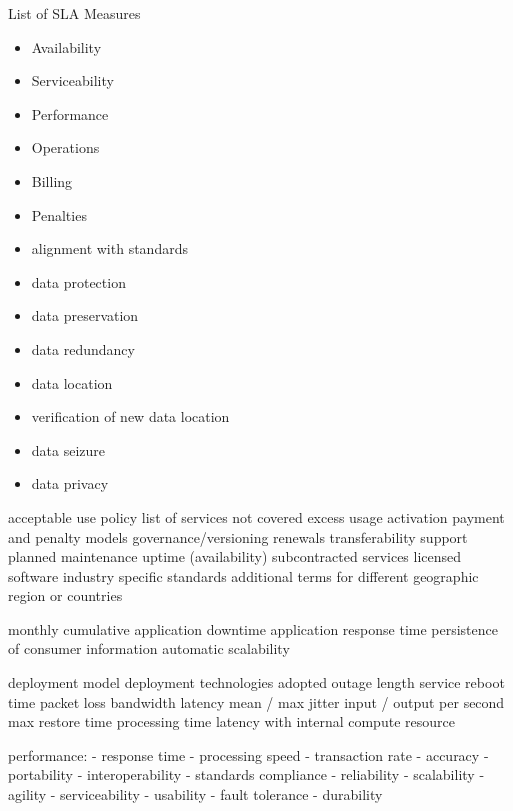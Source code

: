 \documentclass[12pt,a4paper,oneside]{report}
\begin{document}
\begin{center}
\begin{LARGE}
List of SLA Measures
\end{LARGE}

\begin{itemize}
\item Availability
\item Serviceability
\item Performance
\item Operations
\item Billing
\item Penalties
\item alignment with standards
\item data protection
\item data preservation
\item data redundancy
\item data location
\item verification of new data location
\item data seizure
\item data privacy
\end{itemize}

acceptable use policy
list of services not covered
excess usage
activation
payment and penalty models
governance/versioning
renewals
transferability
support
planned maintenance
uptime (availability)
subcontracted services
licensed software
industry specific standards
additional terms for different geographic region or countries

monthly cumulative application downtime
application response time
persistence of consumer information
automatic scalability

deployment model
deployment technologies adopted
outage length
service reboot time
packet loss
bandwidth
latency
mean / max jitter
input / output per second
max restore time
processing time
latency with internal compute resource

performance: 
 - response time
 - processing speed
 - transaction rate
 - accuracy
 - portability
 - interoperability
 - standards compliance 
 - reliability
 - scalability
 - agility
 - serviceability
 - usability
 - fault tolerance
 - durability


\end{center}
\end{document}
